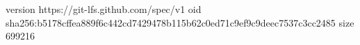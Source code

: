 version https://git-lfs.github.com/spec/v1
oid sha256:b5178cffea889f6c442cd7429478b115b62c0ed71c9ef9c9deec7537c3cc2485
size 699216
